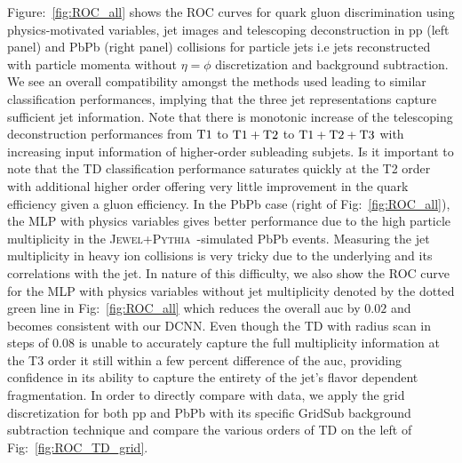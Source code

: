 \documentclass[notoc]{JHEP3}
\newcommand{\jwpy}{\textsc{Jewel+Pythia}~}
\begin{document}
Figure:~\ref{fig:ROC_all} shows the ROC curves for quark gluon discrimination using physics-motivated variables, jet images and telescoping deconstruction in pp (left panel) and PbPb (right panel) collisions for particle jets i.e jets reconstructed with particle momenta without $\eta=\phi$ discretization and background subtraction. We see an overall compatibility amongst the methods used leading to similar classification performances, implying that the three jet representations capture sufficient jet information. Note that there is monotonic increase of the telescoping deconstruction performances from $\rm T1$ to $\rm T1+T2$ to $\rm T1+T2+T3$ with increasing input information of higher-order subleading subjets. Is it important to note that the TD classification performance saturates quickly at the T2 order with additional higher order offering very little improvement in the quark efficiency given a gluon efficiency. In the PbPb case (right of Fig:~\ref{fig:ROC_all}), the MLP with physics variables gives better performance due to the high particle multiplicity in the \jwpy-simulated PbPb events. Measuring the jet multiplicity in heavy ion collisions is very tricky due to the underlying and its correlations with the jet. In nature of this difficulty, we also show the ROC curve for the MLP with physics variables without jet multiplicity denoted by the dotted green line in Fig:~\ref{fig:ROC_all} which reduces the overall auc by $0.02$ and becomes consistent with our DCNN. Even though the TD with radius scan in steps of 0.08 is unable to accurately capture the full multiplicity information at the T3 order it still within a few percent difference of the auc, providing confidence in its ability to capture the entirety of the jet's flavor dependent fragmentation. In order to directly compare with data, we apply the grid discretization for both pp and PbPb with its specific GridSub background subtraction technique and compare the various orders of TD on the left of Fig:~\ref{fig:ROC_TD_grid}.
\end{document}
